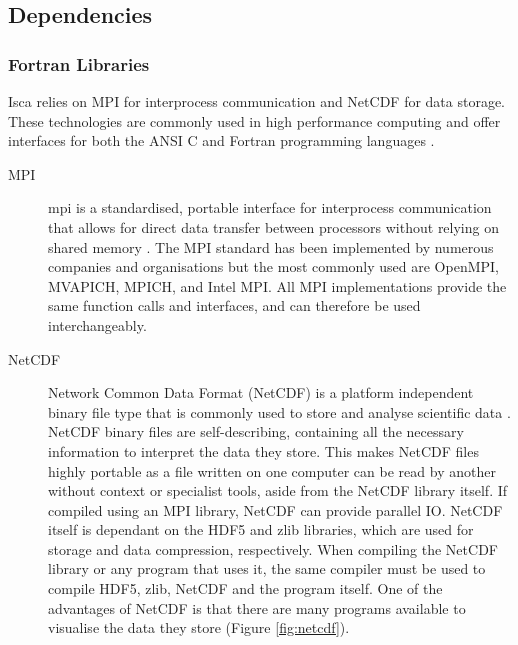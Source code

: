 \documentclass[a4paper,11pt]{report}
\begin{document}
\subsection{Dependencies}
\label{sec:dependencies}
\subsubsection{Fortran Libraries}
Isca relies on MPI for interprocess communication and NetCDF for data storage. These technologies are commonly used in high performance computing and offer interfaces for both the ANSI C and Fortran programming languages \cite{mpi2015standard, rew1990netcdf}.

\begin{description}
	\item[MPI] \gls{mpi} is a standardised, portable interface for interprocess communication that allows for direct data transfer between processors without relying on shared memory \cite{mpi2015standard}. The MPI standard has been implemented by numerous companies and organisations but the most commonly used are OpenMPI, MVAPICH, MPICH, and Intel MPI. All MPI implementations provide the same function calls and interfaces, and can therefore be used interchangeably. 
	
	\item[NetCDF] Network Common Data Format (NetCDF) is a platform independent binary file type that is commonly used to store and analyse scientific data \cite{rew1990netcdf}. NetCDF binary files are self-describing, containing all the necessary information to interpret the data they store. This makes NetCDF files highly portable as a file written on one computer can be read by another without context or specialist tools, aside from the NetCDF library itself. If compiled using an MPI library, NetCDF can provide parallel IO. NetCDF itself is dependant on the HDF5 and zlib libraries, which are used for storage and data compression, respectively. When compiling the NetCDF library or any program that uses it, the same compiler must be used to compile HDF5, zlib, NetCDF and the program itself. One of the advantages of NetCDF is that there are many programs available to visualise the data they store (Figure \ref{fig:netcdf}). 
\end{description}
\end{document}
